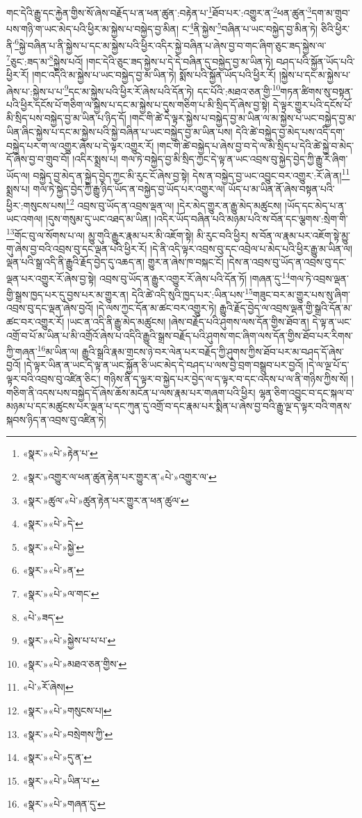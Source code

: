 གང་དེའི་རྒྱུ་དང་རྐྱེན་གྱིས་སོ་ཞེས་བརྗོད་པ་ན་ཕན་ཚུན་:བརྟེན་པ་\footnote{«སྣར་»«པེ་»རྟེན་པ་}ཐོབ་པར་:འགྱུར་ན་\footnote{«སྣར་»འགྱུར་ལ་ཕན་ཚུན་རྟེན་པར་གྱུར་ན་«པེ་»འགྱུར་ལ་}ཕན་ཚུན་\footnote{«སྣར་»ཚུལ་«པེ་»ཚུན་རྟེན་པར་གྱུར་ན་ཕན་ཚུལ་}དག་མ་གྲུབ་པས་གཉི་ག་ཡང་མེད་པའི་ཕྱིར་མ་སྐྱེས་པ་བསྐྱེད་བྱ་མིན། ང་\footnote{«སྣར་»«པེ་»དེ་}ནི་སྐྱེས་\footnote{«སྣར་»«པེ་»སྐྱེ་}བཞིན་པ་ཡང་བསྐྱེད་བྱ་མིན་ཏེ། ཅིའི་ཕྱིར་ནི་\footnote{«སྣར་»«པེ་»ན་}སྐྱེ་བཞིན་པ་ནི་སྐྱེས་པ་དང་མ་སྐྱེས་པའི་ཕྱིར་འདིར་སྐྱེ་བཞིན་པ་ཞེས་བྱ་བ་གང་ཞིག་ཅུང་ཟད་སྐྱེས་ལ་\footnote{«སྣར་»«པེ་»ལ་གང་}ཅུང་:ཟད་མ་\footnote{«པེ་»ཟད་}སྐྱེས་པའོ། །གང་དེའི་ཅུང་ཟད་སྐྱེས་པ་དེ་དེ་བཞིན་དུ་བསྐྱེད་བྱ་མ་ཡིན་ཏེ། བཤད་པའི་སྐྱོན་ཡོད་པའི་ཕྱིར་རོ། །གང་འདིའི་མ་སྐྱེས་པ་ཡང་བསྐྱེད་བྱ་མ་ཡིན་ཏེ། སྨོས་པའི་སྐྱོན་ཡོད་པའི་ཕྱིར་རོ། །སྐྱེས་པ་དང་མ་སྐྱེས་པ་ཞེས་པ་:སྐྱེས་པ་པ་\footnote{«སྣར་»«པེ་»སྐྱེས་པ་པ་པ་}དང་མ་སྐྱེས་པའི་ཕྱིར་རོ་ཞེས་པའི་དོན་ཏེ། དང་པོའི་:མཐའ་ཅན་གྱི་\footnote{«སྣར་»«པེ་»མཐའ་ཅན་གྱིས་}གཏན་ཚིགས་སུ་བསྟན་པའི་ཕྱིར་དངོས་པོ་གཅིག་ལ་སྐྱེས་པ་དང་མ་སྐྱེས་པ་དུས་གཅིག་པ་མི་སྲིད་དོ་ཞེས་བྱ་སྟེ། དེ་ལྟར་གྱུར་པའི་དངོས་པོ་མི་སྲིད་པས་བསྐྱེད་བྱ་མ་ཡིན་པ་ཉིད་དོ། །གང་གི་ཚེ་དེ་ལྟར་སྐྱེས་པ་བསྐྱེད་བྱ་མ་ཡིན་ལ་མ་སྐྱེས་པ་ཡང་བསྐྱེད་བྱ་མ་ཡིན་ཞིང་སྐྱེས་པ་དང་མ་སྐྱེས་པའི་སྐྱེ་བཞིན་པ་ཡང་བསྐྱེད་བྱ་མ་ཡིན་པས། དེའི་ཚེ་བསྐྱེད་བྱ་མེད་པས་འདི་དག་བསྐྱེད་པར་ག་ལ་འགྱུར་ཞེས་པ་དེ་ལྟར་འགྱུར་རོ། །གང་གི་ཚེ་བསྐྱེད་པ་ཞེས་བྱ་བ་དེ་ལ་མི་སྲིད་པ་དེའི་ཚེ་སྐྱེ་བ་མེད་དོ་ཞེས་བྱ་བ་གྲུབ་བོ། །འདིར་སྨྲས་པ། གལ་ཏེ་བསྐྱེད་བྱ་མི་སྲིད་ཀྱང་དེ་ལྟ་ན་ཡང་འབྲས་བུ་སྐྱེད་བྱེད་ཀྱི་རྒྱུ་རེ་ཞིག་ཡོད་ལ། བསྐྱེད་བྱ་མེད་ན་སྐྱེད་བྱེད་ཀྱང་མི་རུང་ངོ་ཞེས་བྱ་སྟེ། དེས་ན་བསྐྱེད་བྱ་ཡང་འབྱུང་བར་འགྱུར་:རོ་ཞེ་ན།\footnote{«པེ་»རོ་ཞེས།} སྨྲས་པ། གལ་ཏེ་སྐྱེད་བྱེད་ཀྱི་རྒྱུ་ཉིད་ཡོད་ན་བསྐྱེད་བྱ་ཡོད་པར་འགྱུར་ལ། ཡོད་པ་མ་ཡིན་ནོ་ཞེས་བསྟན་པའི་ཕྱིར་:གསུངས་པས།\footnote{«སྣར་»«པེ་»གསུངས་པ།} འབྲས་བུ་ཡོད་ན་འབྲས་ལྡན་ལ། །དེར་མེད་གྱུར་ན་རྒྱུ་མེད་མཚུངས། །ཡོད་དང་མེད་པ་ན་ཡང་འགལ། །དུས་གསུམ་དུ་ཡང་འཐད་མ་ཡིན། །འདིར་ཡོད་བཞིན་པའི་མཉམ་པའི་ས་བོན་དང་ལྕགས་:སྲེག་གི་\footnote{«སྣར་»«པེ་»བསྲེགས་ཀྱི་}གོང་བུ་ལ་སོགས་པ་ལ། མྱུ་གུའི་རྒྱུར་རྣམ་པར་མི་འཇོག་སྟེ། མི་རུང་བའི་ཕྱིར། ས་བོན་ལ་རྣམ་པར་འཇོག་སྟེ་མྱུ་གུ་ཞེས་བྱ་བའི་འབྲས་བུ་དང་ལྡན་པའི་ཕྱིར་རོ། །དེ་ནི་འདི་ལྟར་འབྲས་བུ་དང་འབྲེལ་པ་མེད་པའི་ཕྱིར་རྒྱུ་མ་ཡིན་ལ། ལྡན་པའི་སྒྲ་འདི་ནི་རྒྱུའི་རྗོད་བྱེད་དུ་འཆད་ན། གྱུར་ན་ཞེས་ཁ་བསྐང་ངོ། །དེས་ན་འབྲས་བུ་ཡོད་ན་འབྲས་བུ་དང་ལྡན་པར་འགྱུར་རོ་ཞེས་བྱ་སྟེ། འབྲས་བུ་ཡོད་ན་རྒྱུར་འགྱུར་རོ་ཞེས་པའི་དོན་ཏོ། །གཞན་དུ་\footnote{«སྣར་»«པེ་»དུ་ན་}གལ་ཏེ་འབྲས་ལྡན་གྱི་སྒྲས་ཁྱད་པར་དུ་བྱས་པར་མ་གྱུར་ན། དེའི་ཚེ་འདི་སུའི་ཁྱད་པར་:ཡིན་པས་\footnote{«སྣར་»«པེ་»ཡིན་པ་}གཟུང་བར་མ་གྱུར་པས་སུ་ཞིག་འབྲས་བུ་དང་ལྡན་ཞེས་བྱའོ། །དེ་ལས་ཀྱང་དོན་མ་ཚང་བར་འགྱུར་ཏེ། རྒྱུའི་རྗོད་བྱེད་ལ་འབྲས་ལྡན་གྱི་སྒྲའི་དོན་མ་ཚང་བར་འགྱུར་རོ། །ཡང་ན་འདི་ནི་རྒྱུ་མེད་མཚུངས། །ཞེས་བརྗོད་པའི་ཤུགས་ལས་དོན་གྱིས་ཐོབ་ན། དེ་ལྟ་ན་ཡང་འགྲོ་བ་པོ་མ་ཡིན་པ་མི་འགྲོའོ་ཞེས་པ་འདིའི་རྒྱུའི་སྒྲས་བརྗོད་པའི་ཤུགས་གང་ཞིག་ལས་དོན་གྱིས་ཐོབ་པར་རིགས་ཀྱི་གཞན་\footnote{«སྣར་»«པེ་»གཞན་དུ་}མ་ཡིན་ལ། རྒྱུའི་སྒྲའི་རྣམ་གྲངས་ཉེ་བར་ལེན་པར་བརྗོད་ཀྱི་ཤུགས་ཀྱིས་ཐོབ་པར་མ་བཤད་དོ་ཞེས་བྱའོ། །དེ་ལྟར་ཡིན་ན་ཡང་དེ་ལྟ་ན་ཡང་སྐྱོན་ཅི་ཡང་མེད་དེ་བཤད་པ་ལས་བྱེ་བྲག་བསྒྲུབ་པར་བྱའོ། །དེ་ལ་ལྔ་པོ་ད་ལྟར་བའི་འབྲས་བུ་འཛིན་ཅིང་། གཉིས་ནི་ད་ལྟར་བ་སྐྱེད་པར་བྱེད་ལ་ད་ལྟར་བ་དང་འདས་པ་ལ་ནི་གཉིས་ཀྱིས་སོ། །གཅིག་ནི་འདས་པས་བསྐྱེད་དོ་ཞེས་ཆོས་མངོན་པ་ལས་རྣམ་པར་གཞག་པའི་ཕྱིར། ལྷན་ཅིག་འབྱུང་བ་དང་སྐལ་བ་མཉམ་པ་དང་མཚུངས་པར་ལྡན་པ་དང་ཀུན་དུ་འགྲོ་བ་དང་རྣམ་པར་སྨིན་པ་ཞེས་བྱ་བའི་རྒྱུ་ལྔ་ད་ལྟར་བའི་གནས་སྐབས་ཉིད་ན་འབྲས་བུ་འཛིན་ཏེ། 